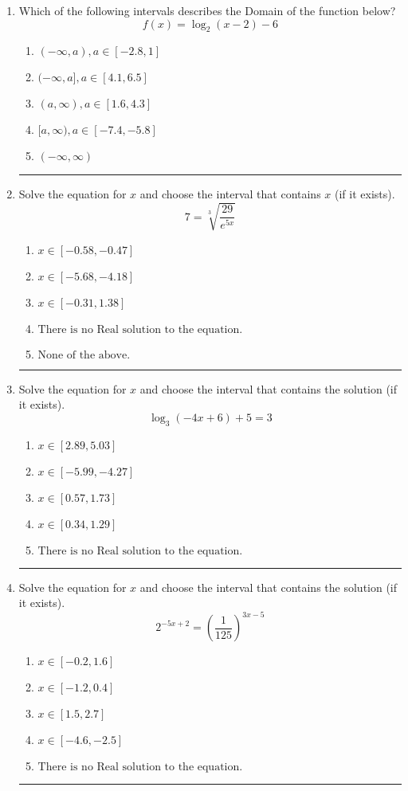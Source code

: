 \documentclass[14pt]{extbook}
\newcommand{\litem}[1]{\item#1\hspace*{-1cm}\rule{\textwidth}{0.4pt}}
\begin{document}
\begin{enumerate}
{\begin{enumerate}[label=\Alph*.]
\end{enumerate} }
\litem{
Which of the following intervals describes the Domain of the function below?\[ f(x) = \log_2{(x-2)}-6 \]\begin{enumerate}[label=\Alph*.]
\item \( (-\infty, a), a \in [-2.8, 1] \)
\item \( (-\infty, a], a \in [4.1, 6.5] \)
\item \( (a, \infty), a \in [1.6, 4.3] \)
\item \( [a, \infty), a \in [-7.4, -5.8] \)
\item \( (-\infty, \infty) \)

\end{enumerate} }
\litem{
 Solve the equation for $x$ and choose the interval that contains $x$ (if it exists).\[  7 = \sqrt[3]{\frac{29}{e^{5x}}} \]\begin{enumerate}[label=\Alph*.]
\item \( x \in [-0.58, -0.47] \)
\item \( x \in [-5.68, -4.18] \)
\item \( x \in [-0.31, 1.38] \)
\item \( \text{There is no Real solution to the equation.} \)
\item \( \text{None of the above.} \)

\end{enumerate} }
\litem{
Solve the equation for $x$ and choose the interval that contains the solution (if it exists).\[ \log_{3}{(-4x+6)}+5 = 3 \]\begin{enumerate}[label=\Alph*.]
\item \( x \in [2.89, 5.03] \)
\item \( x \in [-5.99, -4.27] \)
\item \( x \in [0.57, 1.73] \)
\item \( x \in [0.34, 1.29] \)
\item \( \text{There is no Real solution to the equation.} \)

\end{enumerate} }
\litem{
Solve the equation for $x$ and choose the interval that contains the solution (if it exists).\[ 2^{-5x+2} = \left(\frac{1}{125}\right)^{3x-5} \]\begin{enumerate}[label=\Alph*.]
\item \( x \in [-0.2, 1.6] \)
\item \( x \in [-1.2, 0.4] \)
\item \( x \in [1.5, 2.7] \)
\item \( x \in [-4.6, -2.5] \)
\item \( \text{There is no Real solution to the equation.} \)


\end{enumerate}}
\end{enumerate}
\end{document}
